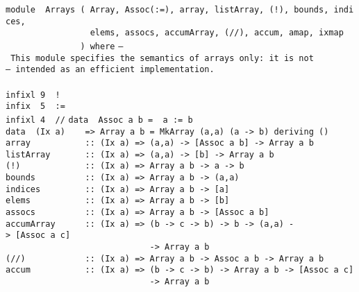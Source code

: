 \noindent\bprogB
\mbox{\tt module\ \ Arrays\ (\ Array,\ Assoc(:=),\ array,\ listArray,\ (!),\ bounds,\ indices,\ }\\
\mbox{\tt \ \ \ \ \ \ \ \ \ \ \ \ \ \ \ \ \ elems,\ assocs,\ accumArray,\ (//),\ accum,\ amap,\ ixmap}\\
\mbox{\tt \ \ \ \ \ \ \ \ \ \ \ \ \ \ \ )\ where}
\eprogB\noindent\bprogB
\mbox{\tt --\ This\ module\ specifies\ the\ semantics\ of\ arrays\ only:\ it\ is\ not}\\
\mbox{\tt --\ intended\ as\ an\ efficient\ implementation.}\\
\mbox{\tt }\\
\mbox{\tt infixl\ 9\ \ !}\\
\mbox{\tt infix\ \ 5\ \ :=}\\
\mbox{\tt infixl\ 4\ \ //}
\eprogB\noindent\bprogB
\mbox{\tt data\ \ Assoc\ a\ b\ =\ \ a\ :=\ b}\\
\mbox{\tt data\ \ (Ix\ a)\ \ \ \ =>\ Array\ a\ b\ =\ MkArray\ (a,a)\ (a\ ->\ b)\ deriving\ ()}
\eprogB\noindent\bprogB
\mbox{\tt array\ \ \ \ \ \ \ \ \ \ \ ::\ (Ix\ a)\ =>\ (a,a)\ ->\ [Assoc\ a\ b]\ ->\ Array\ a\ b}\\
\mbox{\tt listArray\ \ \ \ \ \ \ ::\ (Ix\ a)\ =>\ (a,a)\ ->\ [b]\ ->\ Array\ a\ b}\\
\mbox{\tt (!)\ \ \ \ \ \ \ \ \ \ \ \ \ ::\ (Ix\ a)\ =>\ Array\ a\ b\ ->\ a\ ->\ b}\\
\mbox{\tt bounds\ \ \ \ \ \ \ \ \ \ ::\ (Ix\ a)\ =>\ Array\ a\ b\ ->\ (a,a)}\\
\mbox{\tt indices\ \ \ \ \ \ \ \ \ ::\ (Ix\ a)\ =>\ Array\ a\ b\ ->\ [a]}\\
\mbox{\tt elems\ \ \ \ \ \ \ \ \ \ \ ::\ (Ix\ a)\ =>\ Array\ a\ b\ ->\ [b]}\\
\mbox{\tt assocs\ \ \ \ \ \ \ \ \ \ ::\ (Ix\ a)\ =>\ Array\ a\ b\ ->\ [Assoc\ a\ b]}\\
\mbox{\tt accumArray\ \ \ \ \ \ ::\ (Ix\ a)\ =>\ (b\ ->\ c\ ->\ b)\ ->\ b\ ->\ (a,a)\ ->\ [Assoc\ a\ c]}\\
\mbox{\tt \ \ \ \ \ \ \ \ \ \ \ \ \ \ \ \ \ \ \ \ \ \ \ \ \ \ \ \ \ ->\ Array\ a\ b}\\
\mbox{\tt (//)\ \ \ \ \ \ \ \ \ \ \ \ ::\ (Ix\ a)\ =>\ Array\ a\ b\ ->\ Assoc\ a\ b\ ->\ Array\ a\ b}\\
\mbox{\tt accum\ \ \ \ \ \ \ \ \ \ \ ::\ (Ix\ a)\ =>\ (b\ ->\ c\ ->\ b)\ ->\ Array\ a\ b\ ->\ [Assoc\ a\ c]}\\
\mbox{\tt \ \ \ \ \ \ \ \ \ \ \ \ \ \ \ \ \ \ \ \ \ \ \ \ \ \ \ \ \ ->\ Array\ a\ b}\\
